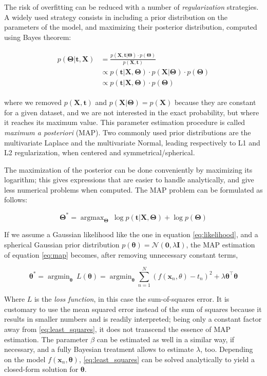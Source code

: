 \documentclass[12pt]{book}
\DeclareMathOperator*{\argmin}{argmin}
\DeclareMathOperator*{\argmax}{argmax}
\begin{document}
The risk of overfitting can be reduced with a number of \emph{regularization} strategies. A widely used strategy consists in including a prior distribution on the parameters of the model, and maximizing their posterior distribution, computed using Bayes theorem:


\begin{align}
\begin{split}
\label{eq:map}
p(\bm\Theta\vert\bm t, \bm X)&=\frac{p(\bm X, \bm t\vert\bm\Theta)\cdot p(\bm\Theta)}{p(\bm X, \bm t)}\\
&\propto p(\bm t\vert \bm X,\bm\Theta)\cdot p(\bm X\vert\bm\Theta)\cdot p(\bm\Theta)\\
&\propto p(\bm t\vert \bm X,\bm\Theta)\cdot p(\bm\Theta)
\end{split}
\end{align}


where we removed $p(\bm X,\bm t)$ and $p(\bm X\vert\bm\Theta)=p(\bm X)$ because they are constant for a given dataset, and we are not interested in the exact probability, but where it reaches its maximum value. This parameter estimation procedure is called \emph{maximum a posteriori} (MAP). Two commonly used prior distributions are the multivariate Laplace and the multivariate Normal, leading respectively to L1 and L2 regularization, when centered and symmetrical/spherical.

The maximization of the posterior can be done conveniently by maximizing its logarithm; this gives expressions that are easier to handle analytically, and give less numerical problems when computed. The MAP problem can be formulated as follows:

\begin{equation}
\bm\Theta^*=\argmax_{\bm\Theta}\ \log p(\bm t\vert\bm X,\bm\Theta)+\log p(\bm\Theta)
\end{equation}


If we assume a Gaussian likelihood like the one in equation \ref{eq:likelihood}, and a spherical Gaussian prior distribution $p(\bm\theta)=\mathcal{N}(\bm 0, \lambda\bm I)$, the MAP estimation of equation \ref{eq:map} becomes, after removing unnecessary constant terms,

\begin{equation}
\label{eq:least_squares}
\bm\theta^*=\argmin_{\bm\theta}\ L(\bm\theta)=\argmin_{\bm\theta}\sum_{n=1}^N\left( f(\bm x_n,\theta)-t_n\right)^2+\lambda\bm\theta^\intercal\bm\theta
\end{equation}

Where $L$ is the \emph{loss function}, in this case the sum-of-squares error. It is customary to use the mean squared error instead of the sum of squares because it results in smaller numbers and is readily interpreted; being only a constant factor away from \ref{eq:least_squares}, it does not transcend the essence of MAP estimation. The parameter $\beta$ can be estimated as well in a similar way, if necessary, and a fully Bayesian treatment allows to estimate $\lambda$, too. Depending on the model $f(\bm x_n,\bm\theta)$, \ref{eq:least_squares} can be solved analytically to yield a closed-form solution for $\bm\theta$.
 
\end{document}
